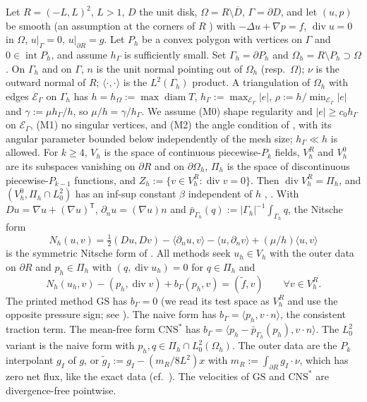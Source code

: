 \documentclass[5p,times]{elsarticle}
\theoremstyle{definition}
\newcommand{\hG}{h_\Gamma}
\newcommand{\hO}{h_\Omega}
\newcommand{\Gh}{\Gamma_h}
\newcommand{\Oh}{\Omega_h}
\newcommand{\EG}{\mathcal E_\Gamma}
\newcommand{\Vh}{V_h}
\newcommand{\VR}{V_h^R}
\newcommand{\VO}{V_h^0}
\newcommand{\Pih}{\Pi_h}
\newcommand{\Zh}{Z_h}
\newcommand{\gI}{g_I}
\newcommand{\dn}{\partial_n}
\newcommand{\ft}{\tilde f}
\newcommand{\pbG}{\bar p_{\Gamma_h}}
\newcommand{\ip}[2]{\langle #1,#2\rangle}
\newcommand{\GS}{\mathrm{GS}}
\newcommand{\CNS}{\mathrm{CNS}^\ast}
\renewcommand{\div}{\operatorname{div}}
\newcommand{\ext}[1]{\cite[#1]{PadhiExt}}
\begin{document}
Let $R=(-L,L)^2$, $L>1$, $D$ the unit disk, $\Omega=R\setminus\overline D$, $\Gamma=\partial D$, and let $(u,p)$ be smooth (an assumption at the corners of $R$ \ext{Rem.~2.5}) with $-\Delta u+\nabla p=f$, $\div u=0$ in $\Omega$, $u|_\Gamma=0$, $u|_{\partial R}=g$. Let $P_h$ be a convex polygon with vertices on $\Gamma$ and $0\in\operatorname{int}P_h$, and assume $\hG$ is sufficiently small. Set $\Gh=\partial P_h$ and $\Oh=R\setminus P_h\supset\Omega$. On $\Gh$ and on $\Gamma$, $n$ is the unit normal pointing out of $\Oh$ (resp.\ $\Omega$); $\nu$ is the outward normal of $R$; $\ip\cdot\cdot$ is the $L^2(\Gh)$ product. A triangulation of $\Oh$ with edges $\EG$ on $\Gh$ has
$h=\hO:=\max\operatorname{diam}T$, $\hG:=\max_{\EG}|e|$, $\rho:=h/\min_{\EG}|e|$ and $\gamma:=\mu\hG/h$, so $\mu/h=\gamma/\hG$.
We assume (M0) shape regularity and $|e|\ge c_0\hG$ on $\EG$, (M1) no singular vertices, and (M2) the angle condition of \cite[Thm.~1]{GuzmanScott2019}, with its angular parameter bounded below independently of the mesh size; $\hG\ll h$ is allowed. For $k\ge4$, $\Vh$ is the space of continuous piecewise-$P_k$ fields, $\VR$ and $\VO$ are its subspaces vanishing on $\partial R$ and on $\partial\Oh$, $\Pih$ is the space of discontinuous piecewise-$P_{k-1}$ functions, and $\Zh:=\{v\in\VR:\div v=0\}$. Then $\div\VR=\Pih$, and $(\VO,\Pih\cap L^2_0)$ has an inf-sup constant $\beta$ independent of $h$ \cite{GuzmanScott2019}, \ext{Lemmas~4.3, 4.5}. With $Du=\nabla u+(\nabla u)^{\mathsf T}$, $\dn u=(\nabla u)n$ and $\pbG(q):=|\Gh|^{-1}\int_{\Gh}q$, the Nitsche form
\[
N_h(u,v)=\tfrac12(Du,Dv)-\ip{\dn u}{v}-\ip{u}{\dn v}+(\mu/h)\ip uv
\]
is the symmetric Nitsche form of \cite{GjerdeScott2024}. All methods seek $u_h\in\Vh$ with the outer data on $\partial R$ and $p_h\in\Pih$ with $(q,\div u_h)=0$ for $q\in\Pih$ and
\begin{equation}\label{eq:methods}
N_h(u_h,v)-(p_h,\div v)+b_\Gamma(p_h,v)=(\ft,v)\qquad\forall v\in\VR .
\end{equation}
The printed method $\GS$ \cite[(28)]{GjerdeScott2024} has $b_\Gamma=0$ (we read its test space as $\VR$ and use the opposite pressure sign; see \ext{\S2}). The naive form has $b_\Gamma=\ip{p_h}{v\cdot n}$, the consistent traction term. The mean-free form $\CNS$ has $b_\Gamma=\ip{p_h-\pbG(p_h)}{v\cdot n}$. The $L^2_0$ variant is the naive form with $p_h,q\in\Pih\cap L^2_0(\Oh)$. The outer data are the $P_k$ interpolant $\gI$ of $g$, or $\tilde g_I:=\gI-(m_R/8L^2)x$ with $m_R:=\int_{\partial R}\gI\cdot\nu$, which has zero net flux, like the exact data (cf.\ \cite{EickmannScottTscherpel2025}). The velocities of $\GS$ and $\CNS$ are divergence-free pointwise.
\end{document}
